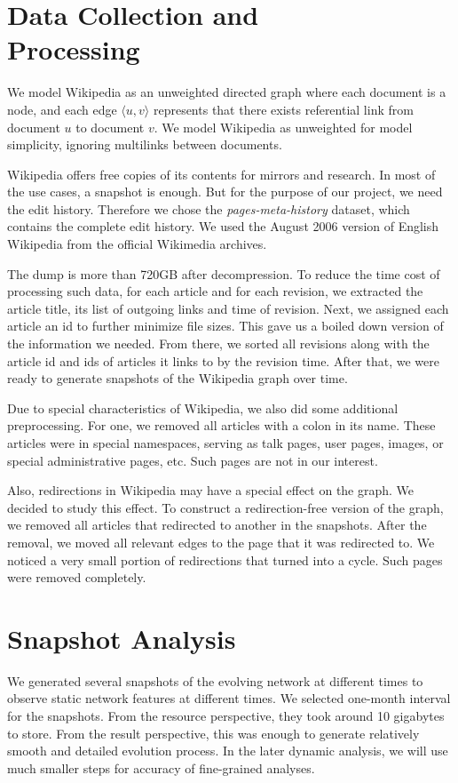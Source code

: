 \documentclass[10pt,twocolumn]{article}
\begin{document}
\section{Data Collection and\\ Processing}
We model Wikipedia as an unweighted directed graph where each document is a node, and each edge $\langle u, v \rangle$ represents that there exists referential link from document $u$ to document $v$. We model Wikipedia as unweighted for model simplicity, ignoring multilinks between documents.

Wikipedia offers free copies of its contents for mirrors and research. In most of the use cases, a snapshot is enough. But for the purpose of our project, we need the edit history. Therefore we chose the {\it pages-meta-history} dataset, which contains the complete edit history. We used the August 2006 version of English Wikipedia from the official Wikimedia archives.

The dump is more than 720GB after decompression. To reduce the time cost of processing such data, for each article and for each revision, we extracted the article title, its list of outgoing links and time of revision. Next, we assigned each article an id to further minimize file sizes. This gave us a boiled down version of the information we needed. From there, we sorted all revisions along with the article id and ids of articles it links to by the revision time. After that, we were ready to generate snapshots of the Wikipedia graph over time.

Due to special characteristics of Wikipedia, we also did some additional preprocessing. For one, we removed all articles with a colon in its name. These articles were in special namespaces, serving as talk pages, user pages, images, or special administrative pages, etc. Such pages are not in our interest.

Also, redirections in Wikipedia may have a special effect on the graph. We decided to study this effect. To construct a redirection-free version of the graph, we removed all articles that redirected to another in the snapshots. After the removal, we moved all relevant edges to the page that it was redirected to. We noticed a very small portion of redirections that turned into a cycle. Such pages were removed completely.

\section{Snapshot Analysis}
We generated several snapshots of the evolving network at different times to observe static network features at different times. We selected one-month interval for the snapshots. From the resource perspective, they took around 10 gigabytes to store. From the result perspective, this was enough to generate relatively smooth and detailed evolution process. In the later dynamic analysis, we will use much smaller steps for accuracy of fine-grained analyses.
\end{document}
